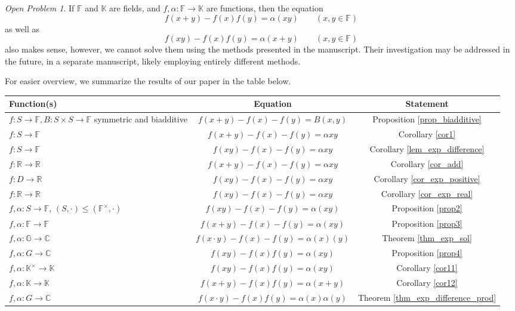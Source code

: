 \documentclass[a4paper,12pt]{article}
\theoremstyle{plain}
\theoremstyle{definition}
\theoremstyle{remark}
\newtheorem*{opp}{Open Problem}
\begin{document}
\begin{opp}
If $\mathbb{F}$ and $\mathbb{K}$ are fields, and $f, \alpha\colon \mathbb{F}\to \mathbb{K}$ are functions, then the equation 
\[
 f(x+y)-f(x)f(y)= \alpha(xy)   
 \qquad 
 \left(x, y\in \mathbb{F}\right)
\]
as well as 
\[
 f(xy)-f(x)f(y)= \alpha(x+y)  
 \qquad 
 \left(x, y\in \mathbb{F}\right)
\]
also makes sense, however, we cannot solve them using the methods presented in the ma\-nu\-script. Their investigation may be addressed in the future, in a separate manuscript, likely employing entirely different methods. 
\end{opp}


For easier overview, we summarize the results of our paper in the table below.



\begin{tabular}{|p{5cm}|c|c|}
\hline 
 Function(s) & Equation & Statement \\ \hline \hline
$f\colon S\to \mathbb{F}, B\colon S\times S\to \mathbb{F}$ symmetric and biadditive  & $f(x+y)-f(x)-f(y)= B(x, y)$  & Proposition \ref{prop_biadditive} \\ \hline
$f\colon S\to \mathbb{F}$ & $f(x+y)-f(x)-f(y)= \alpha xy$& Corollary \ref{cor1} \\ \hline
$f\colon S\to \mathbb{F}$ & $f(xy)-f(x)-f(y)= \alpha xy$& Corollary \ref{lem_exp_difference}\\ \hline
$f\colon \mathbb{R}\to \mathbb{R}$ & $f(x+y)-f(x)-f(y)= \alpha xy$& Corollary \ref{cor_add}\\ \hline
$f\colon D\to \mathbb{R}$ & $f(xy)-f(x)-f(y)= \alpha xy$& Corollary \ref{cor_exp_positive}\\ \hline
$f\colon \mathbb{R}\to \mathbb{R}$ & $f(xy)-f(x)-f(y)= \alpha xy$& Corollary \ref{cor_exp_real} \\ \hline
$f, \alpha \colon S\to \mathbb{F}$, $(S, \cdot)\leq (\mathbb{F}^{\times}, \cdot)$ & $f(xy)-f(x)-f(y)= \alpha(xy)$& Proposition \ref{prop2} \\ \hline
$f, \alpha \colon \mathbb{F}\to \mathbb{F}$ & $f(x+y)-f(x)-f(y)= \alpha(xy)$& Proposition \ref{prop3} \\ \hline 
$f, \alpha \colon \mathbb{G}\to \mathbb{C}$ & $f(x\cdot y)-f(x)-f(y)= \alpha(x)(y)$& Theorem 
\ref{thm_exp_sol} 
\\ \hline \hline 
$f, \alpha \colon G\to \mathbb{C}$ & $f(xy)-f(x)f(y)= \alpha(xy)$& Proposition \ref{prop4} \\ \hline
$f, \alpha \colon \mathbb{K}^{\times}\to \mathbb{K}$ & $f(xy)-f(x)f(y)= \alpha(xy)$ & Corollary \ref{cor11} \\ \hline
$f, \alpha \colon \mathbb{K}\to \mathbb{K}$ & $f(x+y)-f(x)f(y)= \alpha(x+y)$ & Corollary \ref{cor12} \\ \hline
$f, \alpha \colon G\to \mathbb{C}$ & $f(x\cdot y)-f(x)f(y)= \alpha(x)\alpha(y)$& Theorem \ref{thm_exp_difference_prod} \\ \hline

\end{tabular} 
\end{document}
